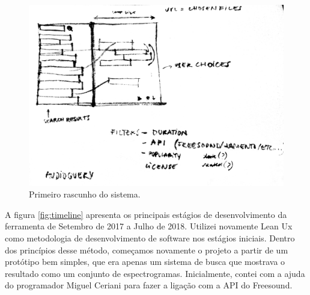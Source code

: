 \begin{figure}
\includegraphics[width=1\textwidth]{pictures/cap4/firstsketch}
\caption{\label{firstsketch}Primeiro rascunho do sistema.}
\label{fig:firstsketch}
\end{figure}


A figura \ref{fig:timeline} apresenta os principais estágios de desenvolvimento da ferramenta de Setembro de 2017 a Julho de 2018. Utilizei novamente Lean Ux \cite{Liikkanen2014} como metodologia de desenvolvimento de software nos estágios iniciais. Dentro dos princípios desse método, começamos novamente o projeto a partir de um protótipo bem simples, que era apenas um sistema de busca que mostrava o resultado como um conjunto de espectrogramas. Inicialmente, contei com a ajuda do programador Miguel Ceriani para fazer a ligação com a API do Freesound.


